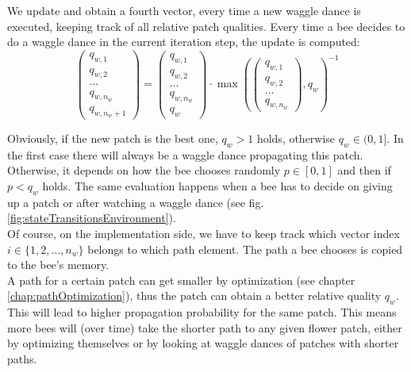 			We update and obtain a fourth vector, every time a new waggle dance is executed, keeping track of all relative patch qualities. Every time a bee decides to do a waggle dance in the current iteration step, the update is computed:
			\begin{equation}\label{eq:evalPatchQualityNormalize}
				\begin{pmatrix}
					q_{w,1} \\ q_{w,2} \\ \dots \\ q_{w,n_w} \\ q_{w,n_w + 1}
				\end{pmatrix}
				=
				\begin{pmatrix}
					q_{w,1} \\ q_{w,2} \\ \dots \\ q_{w,n_w} \\ q_w
				\end{pmatrix}
				\cdot
				\max(
				\begin{pmatrix}
					q_{w,1} \\ q_{w,2} \\ \dots \\ q_{w,n_w}
				\end{pmatrix}, q_w)^{-1}
			\end{equation}
			
			Obviously, if the new patch is the best one, $q_w > 1$ holds, otherwise $q_w \in (0,1]$. In the first case there will always be a waggle dance propagating this patch. Otherwise, it depends on how the bee chooses randomly $p \in [0,1]$ and then if $p < q_w$ holds. The same evaluation happens when a bee has to decide on giving up a patch or after watching a waggle dance (see fig. \ref{fig:stateTransitionsEnvironment}). \\
			Of course, on the implementation side, we have to keep track which vector index $i \in \{1,2, \ldots, n_w\}$ belongs to which path element. The path a bee chooses is copied to the bee's memory.\\

			A path for a certain patch can get smaller by optimization (see chapter \ref{chap:pathOptimization}), thus the patch can obtain a better relative quality $q_w$. This will lead to higher propagation probability for the same patch. This means more bees will (over time) take the shorter path to any given flower patch, either by optimizing themselves or by looking at waggle dances of patches with shorter paths.\\
	

